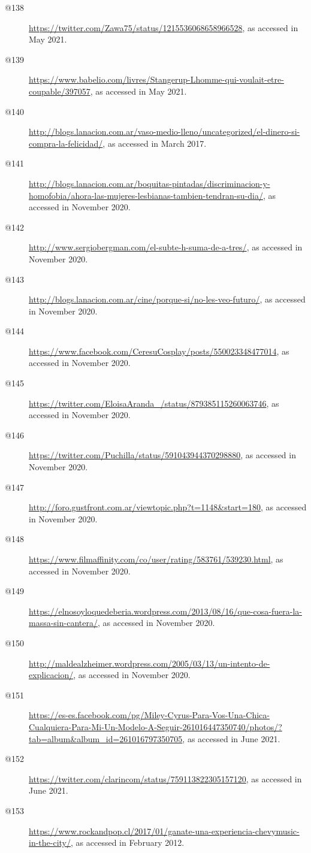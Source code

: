 \begin{flushleft}
\begin{description}
\item[@138] \url{https://twitter.com/Zawa75/status/1215536068658966528}, as accessed in May 2021.
\item[@139] \url{https://www.babelio.com/livres/Stangerup-Lhomme-qui-voulait-etre-coupable/397057}, as accessed in May 2021.
\item[@140] \url{http://blogs.lanacion.com.ar/vaso-medio-lleno/uncategorized/el-dinero-si-compra-la-felicidad/}{, as accessed in March 2017.}
\item[@141] \url{http://blogs.lanacion.com.ar/boquitas-pintadas/discriminacion-y-homofobia/ahora-las-mujeres-lesbianas-tambien-tendran-su-dia/}, as accessed in November 2020.
\item[@142] \url{http://www.sergiobergman.com/el-subte-h-suma-de-a-tres/}, as accessed in November 2020.
\item[@143] \url{http://blogs.lanacion.com.ar/cine/porque-si/no-les-veo-futuro/}, as accessed in November 2020.
\item[@144] \url{https://www.facebook.com/CeresuCosplay/posts/550023348477014}, as accessed in November 2020.
\item[@145] \url{https://twitter.com/EloisaAranda_/status/879385115260063746}, as accessed in November 2020.
\item[@146] \url{https://twitter.com/Puchilla/status/591043944370298880}, as accessed in November 2020.
\item[@147] \url{http://foro.gustfront.com.ar/viewtopic.php?t=1148&start=180}, as accessed in November 2020.
\item[@148] \url{https://www.filmaffinity.com/co/user/rating/583761/539230.html}, as accessed in November 2020.
\item[@149] \url{https://elnosoyloquedeberia.wordpress.com/2013/08/16/que-cosa-fuera-la-massa-sin-cantera/}, as accessed in November 2020.
\item[@150] \url{http://maldealzheimer.wordpress.com/2005/03/13/un-intento-de-explicacion/}, as accessed in November 2020.
\item[@151] \url{https://es-es.facebook.com/pg/Miley-Cyrus-Para-Vos-Una-Chica-Cualquiera-Para-Mi-Un-Modelo-A-Seguir-261016447350740/photos/?tab=album&album_id=261016797350705}, as accessed in June 2021.
\item[@152] \url{https://twitter.com/clarincom/status/759113822305157120}, as accessed in June 2021.
\item[@153]\url{https://www.rockandpop.cl/2017/01/ganate-una-experiencia-chevymusic-in-the-city/}, as accessed in February 2012.

\end{description}
\end{flushleft}
